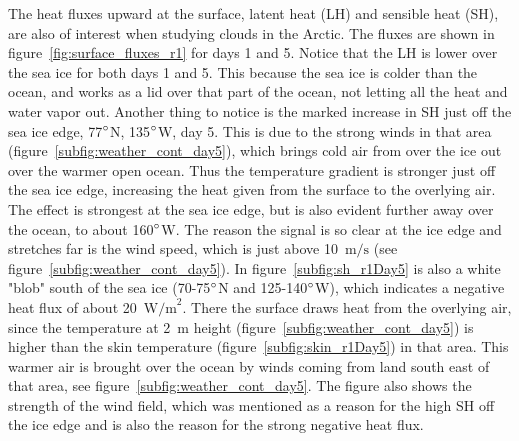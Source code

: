 The heat fluxes upward at the surface, latent heat (LH) and sensible heat (SH), are also of interest when studying clouds in the Arctic. The fluxes are shown in figure~\ref{fig:surface_fluxes_r1} for days 1 and 5. Notice that the LH is lower over the sea ice for both days 1 and 5. This because the sea ice is colder than the ocean, and works as a lid over that part of the ocean, not letting all the heat and water vapor out. Another thing to notice is the marked increase in SH just off the sea ice edge, 77$\degree$N, 135$\degree$W, day 5. This is due to the strong winds in that area (figure~\ref{subfig:weather_cont_day5}), which brings cold air from over the ice out over the warmer open ocean. Thus the temperature gradient is stronger just off the sea ice edge, increasing the heat given from the surface to the overlying air. The effect is strongest at the sea ice edge, but is also evident further away over the ocean, to about 160$\degree$W. The reason the signal is so clear at the ice edge and stretches far is the wind speed, which is just above 10~$\text{m/s}$ (see figure~\ref{subfig:weather_cont_day5}). In figure~\ref{subfig:sh_r1Day5} is also a white "blob" south of the sea ice (70-75$\degree$N and 125-140$\degree$W), which indicates a negative heat flux of about 20~$\text{W/m}^2$. There the surface draws heat from the overlying air, since the temperature at 2~m height (figure~\ref{subfig:weather_cont_day5}) is higher than the skin temperature (figure~\ref{subfig:skin_r1Day5}) in that area. This warmer air is brought over the ocean by winds coming from land south east of that area, see figure~\ref{subfig:weather_cont_day5}. The figure also shows the strength of the wind field, which was mentioned as a reason for the high SH off the ice edge and is also the reason for the strong negative heat flux.


